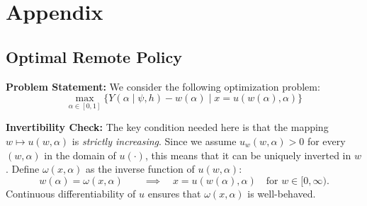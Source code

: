 \documentclass[
  11pt,
  letterpaper,
  DIV=11,
  numbers=noendperiod]{scrartcl}
\theoremstyle{plain}
\theoremstyle{remark}
\begin{document}
\newpage

\setcounter{section}{0}
\renewcommand{\thesection}{\Alph{section}}

\setcounter{table}{0}
\renewcommand{\thetable}{A\arabic{table}}

\setcounter{figure}{0}
\renewcommand{\thefigure}{A\arabic{figure}}

\section{Appendix}\label{appendix}

\subsection{Optimal Remote
Policy}\label{sec-appendix-remote-policy-general}

\textbf{Problem Statement:} We consider the following optimization
problem: \[
\max_{\alpha \in [0,1]} \Big\{ Y(\alpha \mid \psi, h) - w(\alpha) \;\Big|\; x = u(w(\alpha), \alpha) \Big\}
\]

\textbf{Invertibility Check:} The key condition needed here is that the
mapping \(w \mapsto u(w,\alpha)\) is \emph{strictly increasing}. Since
we assume \(u_w(w,\alpha) > 0\) for every \((w,\alpha)\) in the domain
of \(u(\cdot)\), this means that it can be uniquely inverted in \(w\).
Define \(\omega(x,\alpha)\) as the inverse function of \(u(w,\alpha)\):
\[
w(\alpha) = \omega(x,\alpha) \qquad \implies \quad x = u(w(\alpha),\alpha) \quad \text{for } w \in [0,\infty).
\] Continuous differentiability of \(u\) ensures that
\(\omega(x,\alpha)\) is well-behaved.
\end{document}
